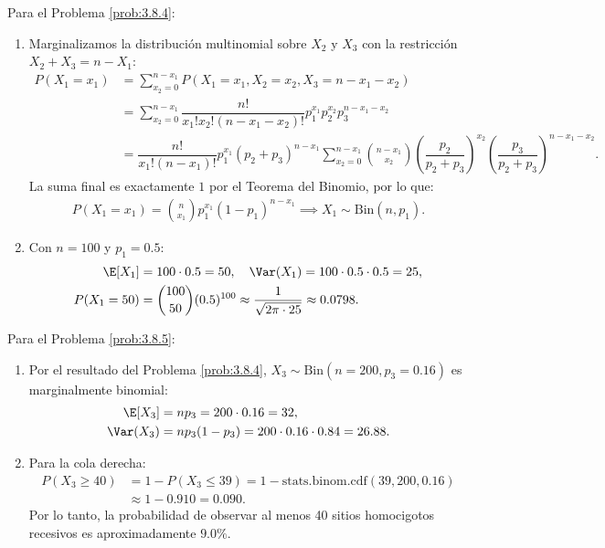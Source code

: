 \begin{solucion}
	\label{sol:3.8.4}
	Para el Problema \ref{prob:3.8.4}:
	\begin{enumerate}
		\item Marginalizamos la distribución multinomial sobre $X_{2}$ y $X_{3}$ con la restricción $X_{2} + X_{3} = n - X_{1}$:
		\begin{align*}
			P(X_{1} = x_{1}) &= \sum_{x_{2}=0}^{n-x_{1}} P(X_{1} = x_{1}, X_{2} = x_{2}, X_{3} = n - x_{1} - x_{2}) \\
			&= \sum_{x_{2}=0}^{n-x_{1}} \dfrac{n!}{x_{1}! x_{2}! (n - x_{1} - x_{2})!} p_{1}^{x_{1}} p_{2}^{x_{2}} p_{3}^{n-x_{1}-x_{2}} \\
			&= \dfrac{n!}{x_{1}! (n-x_{1})!} p_{1}^{x_{1}} (p_{2} + p_{3})^{n-x_{1}} \sum_{x_{2}=0}^{n-x_{1}} \binom{n-x_{1}}{x_{2}} \left(\dfrac{p_{2}}{p_{2}+p_{3}}\right)^{x_{2}} \left(\dfrac{p_{3}}{p_{2}+p_{3}}\right)^{n-x_{1}-x_{2}}.
		\end{align*}
		La suma final es exactamente $1$ por el Teorema del Binomio, por lo que:
		\begin{align*}
			P(X_{1} = x_{1}) = \binom{n}{x_{1}} p_{1}^{x_{1}} (1 - p_{1})^{n - x_{1}} \implies X_{1} \sim \text{Bin}(n, p_{1}).
		\end{align*}
		\item Con $n = 100$ y $p_{1} = 0.5$:
		\begin{align*}
			\E[X_{1}] &= 100 \cdot 0.5 = 50, \quad \Var(X_{1}) = 100 \cdot 0.5 \cdot 0.5 = 25, \\
			P(X_{1} = 50) &= \binom{100}{50} (0.5)^{100} \approx \dfrac{1}{\sqrt{2\pi \cdot 25}} \approx 0.0798.
		\end{align*}
	\end{enumerate}
\end{solucion}

\begin{solucion}
	\label{sol:3.8.5}
	Para el Problema \ref{prob:3.8.5}:
	\begin{enumerate}
		\item Por el resultado del Problema \ref{prob:3.8.4}, $X_{3} \sim \text{Bin}(n = 200, p_{3} = 0.16)$ es marginalmente binomial:
		\begin{align*}
			\E[X_{3}] &= np_{3} = 200 \cdot 0.16 = 32, \\
			\Var(X_{3}) &= np_{3}(1 - p_{3}) = 200 \cdot 0.16 \cdot 0.84 = 26.88.
		\end{align*}
		\item Para la cola derecha:
		\begin{align*}
			P(X_{3} \ge 40) &= 1 - P(X_{3} \le 39) = 1 - \text{stats.binom.cdf}(39, 200, 0.16) \\
			&\approx 1 - 0.910 = 0.090.
		\end{align*}
		Por lo tanto, la probabilidad de observar al menos 40 sitios homocigotos recesivos es aproximadamente $9.0\%$.
	\end{enumerate}
\end{solucion}

